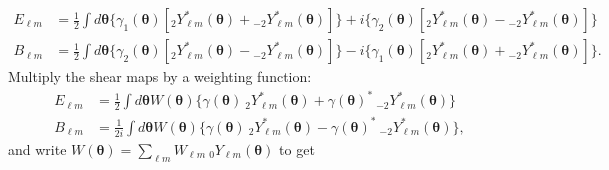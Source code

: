  \begin{align}
     E_{\ell m} &= \frac{1}{2}\int d\bm{\theta} \{\gamma_1(\bm{\theta})[{}_2Y^*_{\ell m}(\bm{\theta}) + {}_{-2}Y^*_{\ell m}(\bm{\theta})]\} +  i\{\gamma_2(\bm{\theta})[{}_2Y^*_{\ell m}(\bm{\theta}) - {}_{-2}Y^*_{\ell m}(\bm{\theta})]\} \\
     B_{\ell m} &= \frac{1}{2}\int d\bm{\theta} \{\gamma_2(\bm{\theta})[{}_2Y^*_{\ell m}(\bm{\theta}) - {}_{-2}Y^*_{\ell m}(\bm{\theta})]\} -  i\{\gamma_1(\bm{\theta})[{}_2Y^*_{\ell m}(\bm{\theta}) + {}_{-2}Y^*_{\ell m}(\bm{\theta})]\}.
 \end{align}
 Multiply the shear maps by a weighting function:
 \begin{align}
     E_{\ell m} &= \frac{1}{2}\int d\bm{\theta} W(\bm{\theta}) \{\gamma(\bm{\theta})~ {}_2Y^*_{\ell m}(\bm{\theta}) + \gamma(\bm{\theta})^*~{}_{-2}Y^*_{\ell m}(\bm{\theta})\}\\
     B_{\ell m} &= \frac{1}{2i}\int d\bm{\theta} W(\bm{\theta}) \{\gamma(\bm{\theta})~ {}_2Y^*_{\ell m}(\bm{\theta}) - \gamma(\bm{\theta})^*~{}_{-2}Y^*_{\ell m}(\bm{\theta})\},
 \end{align}
 and write $W(\bm{\theta}) = \sum_{\ell m} W_{\ell m} ~{}_0Y_{\ell m}(\bm{\theta})$ to get

